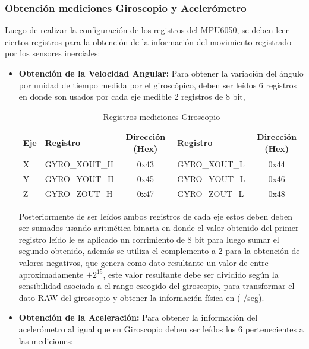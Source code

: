 \documentclass[12pt,a4paper]{article}
\newcommand{\grad}{$^{\circ}$}
\begin{document}
\subsubsection{Obtención mediciones Giroscopio y Acelerómetro}
Luego de realizar la configuración de los registros del MPU6050, se deben leer ciertos registros para la obtención de la información del movimiento registrado por los sensores inerciales:

\begin{itemize}
	\item \textbf{Obtención de la Velocidad Angular:} Para obtener la variación del ángulo por unidad de tiempo medida por el giroscópico, deben ser leídos 6 registros en donde son usados por cada eje medible 2 registros de 8 bit,
	
	\begin{table}[H]
		\centering
		\label{table:registrosgyro}
		\begin{tabular}{|l|l|c|l|c|}
			\hline
			\textbf{Eje} & \textbf{Registro} & \textbf{Dirección (Hex)} & \textbf{Registro} & \textbf{Dirección (Hex)} \\ \hline
			X            & GYRO\_XOUT\_H     & 0x43                     & GYRO\_XOUT\_L     & 0x44                     \\ \hline
			Y            & GYRO\_YOUT\_H     & 0x45                     & GYRO\_YOUT\_L     & 0x46                     \\ \hline
			Z            & GYRO\_ZOUT\_H     & 0x47                     & GYRO\_ZOUT\_L     & 0x48                     \\ \hline
		\end{tabular}
		\caption{Registros mediciones Giroscopio}					
	\end{table}
	
	Posteriormente de ser leídos ambos registros de cada eje estos deben deben ser sumados usando aritmética binaria en donde el valor obtenido del primer registro leído le es aplicado un corrimiento de 8 bit para luego sumar el segundo obtenido, además se utiliza el complemento a 2 para la obtención de valores negativos, que genera como dato resultante un valor de entre aproximadamente $\pm 2^{15}$, este valor resultante debe ser dividido según la sensibilidad asociada a el rango escogido del giroscopio, para transformar el dato RAW del giroscopio y obtener la información física en (\grad/seg).
	
	\item \textbf{Obtención de la Aceleración:} Para obtener la información del acelerómetro al igual que en Giroscopio deben ser leídos los 6 pertenecientes a las mediciones:


\end{itemize}
\end{document}
